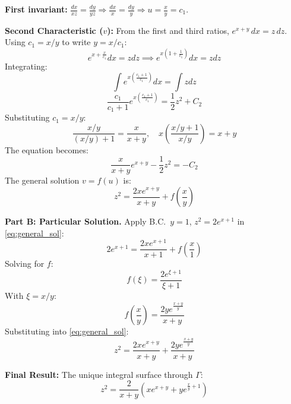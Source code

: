 \documentclass[a4paper,11pt]{article} %
\begin{document}
\textbf{First invariant:} $\frac{dx}{xz}=\frac{dy}{yz}\Rightarrow \frac{dx}{x}=\frac{dy}{y}\Rightarrow u=\tfrac{x}{y}=c_1$.

\textbf{Second Characteristic ($v$):} From the first and third ratios, $e^{x+y}\,dx = z\,dz$.
Using $c_1=x/y$ to write $y=x/c_1$:
\begin{equation}
    e^{x + \frac{x}{c_1}} dx = z dz \implies e^{x\left(1 + \frac{1}{c_1}\right)} dx = z dz
\end{equation}
Integrating:
\begin{equation}
    \int e^{x\left(\frac{c_1+1}{c_1}\right)} dx = \int z dz
\end{equation}
\begin{equation}
    \frac{c_1}{c_1+1} e^{x\left(\frac{c_1+1}{c_1}\right)} = \frac{1}{2}z^2 + C_2
\end{equation}
Substituting $c_1 = x/y$:
\begin{equation}
    \frac{x/y}{(x/y)+1} = \frac{x}{x+y}, \quad x\left(\frac{x/y+1}{x/y}\right) = x+y
\end{equation}
The equation becomes:
\begin{equation}
    \frac{x}{x+y} e^{x+y} - \frac{1}{2}z^2 = -C_2
\end{equation}
The general solution $v=f(u)$ is:
\begin{equation} \label{eq:general_sol}
    z^2 = \frac{2x e^{x+y}}{x+y} + f\left(\frac{x}{y}\right)
\end{equation}

\textbf{Part B: Particular Solution.}
Apply B.C.\ $y=1$, $z^2=2e^{x+1}$ in \eqref{eq:general_sol}:
\begin{equation}
    2e^{x+1} = \frac{2x e^{x+1}}{x+1} + f\left(\frac{x}{1}\right)
\end{equation}
Solving for $f$:
\begin{equation}
    f(\xi) = \frac{2e^{\xi+1}}{\xi+1}
\end{equation}
With $\xi=x/y$:
\begin{equation}
    f\left(\frac{x}{y}\right) = \frac{2y e^{\frac{x+y}{y}}}{x+y}
\end{equation}
Substituting into \eqref{eq:general_sol}:
\begin{equation}
    z^2 = \frac{2x e^{x+y}}{x+y} + \frac{2y e^{\frac{x+y}{y}}}{x+y}
\end{equation}

\textbf{Final Result:}
The unique integral surface through $\Gamma$:
\begin{equation}
    \boxed{ z^2 = \frac{2}{x+y} \left( x e^{x+y} + y e^{\frac{x}{y} + 1} \right) }
\end{equation}
\end{document}
